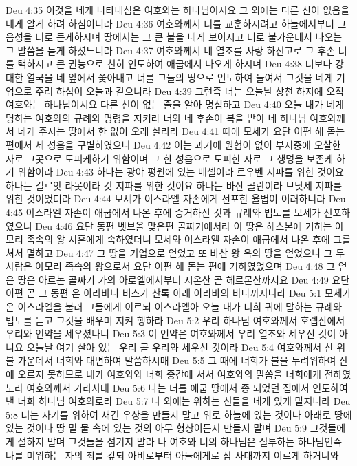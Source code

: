 Deu 4:35  이것을 네게 나타내심은 여호와는 하나님이시요 그 외에는 다른 신이 없음을 네게 알게 하려 하심이니라
Deu 4:36  여호와께서 너를 교훈하시려고 하늘에서부터 그 음성을 너로 듣게하시며 땅에서는 그 큰 불을 네게 보이시고 너로 불가운데서 나오는 그 말씀을 듣게 하셨느니라
Deu 4:37  여호와께서 네 열조를 사랑 하신고로 그 후손 너를 택하시고 큰 권능으로 친히 인도하여 애굽에서 나오게 하시며
Deu 4:38  너보다 강대한 열국을 네 앞에서 쫓아내고 너를 그들의 땅으로 인도하여 들여서 그것을 네게 기업으로 주려 하심이 오늘과 같으니라
Deu 4:39  그런즉 너는 오늘날 상천 하지에 오직 여호와는 하나님이시요 다른 신이 없는 줄을 알아 명심하고
Deu 4:40  오늘 내가 네게 명하는 여호와의 규례와 명령을 지키라 너와 네 후손이 복을 받아 네 하나님 여호와께서 네게 주시는 땅에서 한 없이 오래 살리라
Deu 4:41  때에 모세가 요단 이편 해 돋는 편에서 세 성읍을 구별하였으니
Deu 4:42  이는 과거에 원혐이 없이 부지중에 오살한 자로 그곳으로 도피케하기 위함이며 그 한 성읍으로 도피한 자로 그 생명을 보존케 하기 위함이라
Deu 4:43  하나는 광야 평원에 있는 베셀이라 르우벤 지파를 위한 것이요 하나는 길르앗 라못이라 갓 지파를 위한 것이요 하나는 바산 골란이라 므낫세 지파를 위한 것이었더라
Deu 4:44  모세가 이스라엘 자손에게 선포한 율법이 이러하니라
Deu 4:45  이스라엘 자손이 애굽에서 나온 후에 증거하신 것과 규례와 법도를 모세가 선포하였으니
Deu 4:46  요단 동편 벳브올 맞은편 골짜기에서라 이 땅은 헤스본에 거하는 아모리 족속의 왕 시혼에게 속하였더니 모세와 이스라엘 자손이 애굽에서 나온 후에 그를 쳐서 멸하고
Deu 4:47  그 땅을 기업으로 얻었고 또 바산 왕 옥의 땅을 얻었으니 그 두 사람은 아모리 족속의 왕으로서 요단 이편 해 돋는 편에 거하였었으며
Deu 4:48  그 얻은 땅은 아르논 골짜기 가의 아로엘에서부터 시온산 곧 헤르몬산까지요
Deu 4:49  요단 이편 곧 그 동편 온 아라바니 비스가 산록 아래 아라바의 바다까지니라
Deu 5:1  모세가 온 이스라엘을 불러 그들에게 이르되 이스라엘아 오늘 내가 너희 귀에 말하는 규례와 법도를 듣고 그것을 배우며 지켜 행하라
Deu 5:2  우리 하나님 여호와께서 호렙산에서 우리와 언약을 세우셨나니
Deu 5:3  이 언약은 여호와께서 우리 열조와 세우신 것이 아니요 오늘날 여기 살아 있는 우리 곧 우리와 세우신 것이라
Deu 5:4  여호와께서 산 위 불 가운데서 너희와 대면하여 말씀하시매
Deu 5:5  그 때에 너희가 불을 두려워하여 산에 오르지 못하므로 내가 여호와와 너희 중간에 서서 여호와의 말씀을 너희에게 전하였노라 여호와께서 가라사대
Deu 5:6  나는 너를 애굽 땅에서 종 되었던 집에서 인도하여 낸 너희 하나님 여호와로라
Deu 5:7  나 외에는 위하는 신들을 네게 있게 말지니라
Deu 5:8  너는 자기를 위하여 새긴 우상을 만들지 말고 위로 하늘에 있는 것이나 아래로 땅에 있는 것이나 땅 밑 물 속에 있는 것의 아무 형상이든지 만들지 말며
Deu 5:9  그것들에게 절하지 말며 그것들을 섬기지 말라 나 여호와 너의 하나님은 질투하는 하나님인즉 나를 미워하는 자의 죄를 갚되 아비로부터 아들에게로 삼 사대까지 이르게 하거니와
